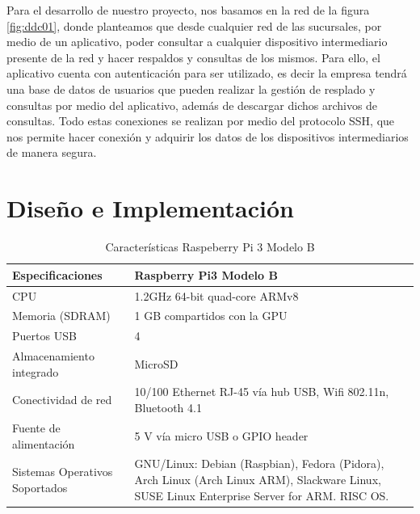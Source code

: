 \documentclass[conference]{IEEEtran}
\begin{document}
Para el desarrollo de nuestro proyecto, nos basamos en la red de la figura \ref{fig:ddc01}, donde planteamos que desde cualquier red de las sucursales, por medio de un aplicativo, poder consultar a cualquier dispositivo intermediario presente de la red y hacer respaldos y consultas de los mismos. Para ello, el aplicativo cuenta con autenticación para ser utilizado, es decir la empresa tendrá una base de datos de usuarios que pueden realizar la gestión de resplado y consultas por medio del aplicativo, además de descargar dichos archivos de consultas. Todo estas conexiones se realizan por medio del protocolo SSH, que nos permite hacer conexión y adquirir los datos de los dispositivos intermediarios de manera segura.

\section{Diseño e Implementación}

\begin{table}[tbp]
\begin{center}
	\begin{tabular}{|p{2.5cm}|p{5.5cm}|}
	\hline
	\textbf{Especificaciones} &\textbf{Raspberry Pi3 Modelo B} \\ \hline
	CPU  &1.2GHz 64-bit quad-core ARMv8 \\\hline
	Memoria (SDRAM) &1 GB compartidos con la GPU \\\hline
	Puertos USB &4 \\\hline
	Almacenamiento integrado &MicroSD \\\hline
	Conectividad de red &10/100 Ethernet RJ-45 vía hub USB, Wifi 802.11n, Bluetooth 4.1 \\\hline
	Fuente de alimentación &5 V vía micro USB o GPIO header \\\hline
	Sistemas Operativos Soportados &GNU/Linux: Debian (Raspbian), Fedora (Pidora), Arch Linux (Arch Linux ARM), Slackware Linux, SUSE Linux Enterprise Server for ARM. RISC OS.\\\hline
\end{tabular}\vspace{0.25cm}
\caption{Características Raspeberry Pi 3 Modelo B}
\label{tab:rb01}
\end{center}
\end{table}
\end{document}

